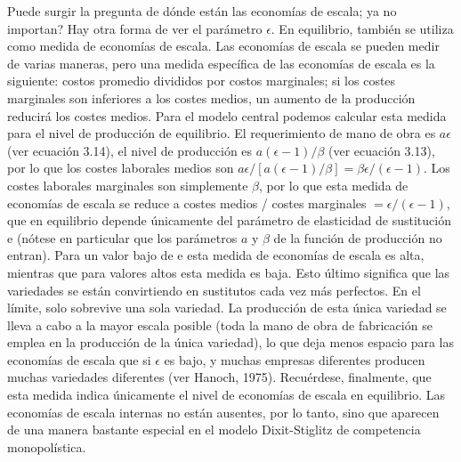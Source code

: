 Puede surgir la pregunta de dónde están las economías de escala; ya no importan? Hay otra forma de ver el parámetro $\epsilon$. En equilibrio, también se utiliza como medida de economías de escala. Las economías de escala se pueden medir de varias maneras, pero una medida específica de las economías de escala es la siguiente: costos promedio divididos por costos marginales; si los costes marginales son inferiores a los costes medios, un aumento de la producción reducirá los costes medios. Para el modelo central podemos calcular esta medida para el nivel de producción de equilibrio. El requerimiento de mano de obra es $a\epsilon$ (ver ecuación 3.14), el nivel de producción es $a(\epsilon- 1)/\beta$ (ver ecuación 3.13), por lo que los costes laborales medios son $a\epsilon/[a(\epsilon- 1)/\beta] = \beta \epsilon/(\epsilon - 1)$. Los costes laborales marginales son simplemente $\beta$, por lo que esta medida de economías de escala se reduce a costes medios / costes marginales $= \epsilon/(\epsilon-1)$, que en equilibrio depende únicamente del parámetro de elasticidad de sustitución e (nótese en particular que los parámetros $a$ y $\beta$ de la función de producción no entran). Para un valor bajo de e esta medida de economías de escala es alta, mientras que para valores altos esta medida es baja. Esto último significa que las variedades se están convirtiendo en sustitutos cada vez más perfectos. En el límite, solo sobrevive una sola variedad. La producción de esta única variedad se lleva a cabo a la mayor escala posible (toda la mano de obra de fabricación se emplea en la producción de la única variedad), lo que deja menos espacio para las economías de escala que si $\epsilon$ es bajo, y muchas empresas diferentes producen muchas variedades diferentes (ver Hanoch, 1975). Recuérdese, finalmente, que esta medida indica únicamente el nivel de economías de escala en equilibrio. Las economías de escala internas no están ausentes, por lo tanto, sino que aparecen de una manera bastante especial en el modelo Dixit-Stiglitz de competencia monopolística.















